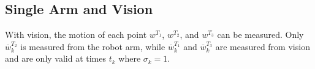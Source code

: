 \documentclass[runningheads,a4paper]{llncs}
\begin{document}



\subsection{Single Arm and Vision \label{sec-w_vis}}
With vision, the motion of each point $w^{T_1}$, $w^{T_2}$, and $w^{T_3}$ can be measured. Only $\overline{w}_k^{T_2}$ is measured from the robot arm, while $\overline{w}_k^{T_1}$ and $\overline{w}_k^{T_3}$ are measured from vision and are only valid at times $t_k$ where $\sigma_k = 1$.

\end{document}

